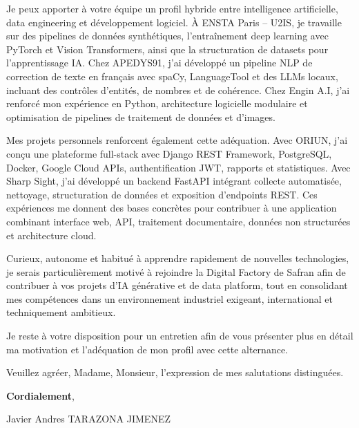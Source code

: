 \documentclass[10pt,a4paper]{article}
\begin{document}
{Je peux apporter à votre équipe un profil hybride entre intelligence artificielle, data engineering et développement logiciel. À ENSTA Paris – U2IS, je travaille sur des pipelines de données synthétiques, l’entraînement deep learning avec PyTorch et Vision Transformers, ainsi que la structuration de datasets pour l’apprentissage IA. Chez APEDYS91, j’ai développé un pipeline NLP de correction de texte en français avec spaCy, LanguageTool et des LLMs locaux, incluant des contrôles d’entités, de nombres et de cohérence. Chez Engin A.I, j’ai renforcé mon expérience en Python, architecture logicielle modulaire et optimisation de pipelines de traitement de données et d’images.

Mes projets personnels renforcent également cette adéquation. Avec ORIUN, j’ai conçu une plateforme full-stack avec Django REST Framework, PostgreSQL, Docker, Google Cloud APIs, authentification JWT, rapports et statistiques. Avec Sharp Sight, j’ai développé un backend FastAPI intégrant collecte automatisée, nettoyage, structuration de données et exposition d’endpoints REST. Ces expériences me donnent des bases concrètes pour contribuer à une application combinant interface web, API, traitement documentaire, données non structurées et architecture cloud.

Curieux, autonome et habitué à apprendre rapidement de nouvelles technologies, je serais particulièrement motivé à rejoindre la Digital Factory de Safran afin de contribuer à vos projets d’IA générative et de data platform, tout en consolidant mes compétences dans un environnement industriel exigeant, international et techniquement ambitieux.

Je reste à votre disposition pour un entretien afin de vous présenter plus en détail ma motivation et l’adéquation de mon profil avec cette alternance.

Veuillez agréer, Madame, Monsieur, l’expression de mes salutations distinguées.

\textbf{Cordialement},

Javier Andres TARAZONA JIMENEZ


}
\end{document}
